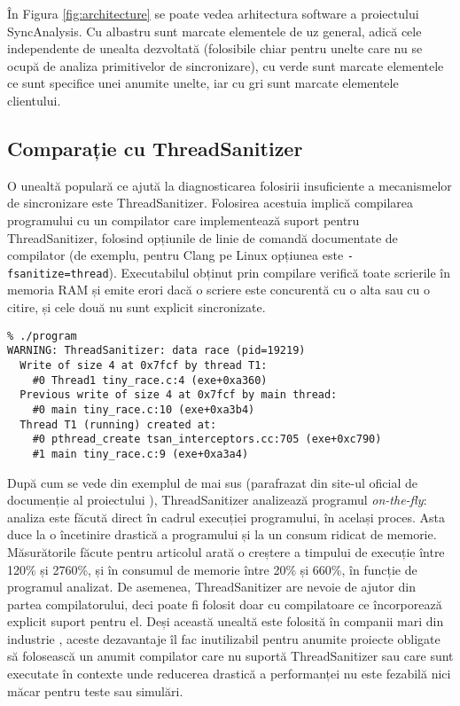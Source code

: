 În Figura \ref{fig:architecture} se poate vedea arhitectura software a
proiectului SyncAnalysis. Cu albastru sunt marcate elementele de uz
general, adică cele independente de unealta dezvoltată (folosibile chiar
pentru unelte care nu se ocupă de analiza primitivelor de sincronizare),
cu verde sunt marcate elementele ce sunt specifice unei anumite unelte,
iar cu gri sunt marcate elementele clientului.

\subsection{Comparație cu ThreadSanitizer}
O unealtă populară ce ajută la diagnosticarea folosirii insuficiente a
mecanismelor de sincronizare este ThreadSanitizer\cite{ThreadSanitizer}.
Folosirea acestuia implică compilarea programului cu un compilator care
implementează suport pentru ThreadSanitizer, folosind opțiunile de linie
de comandă documentate de compilator (de exemplu, pentru Clang pe Linux
opțiunea este \lstinline{-fsanitize=thread}). Executabilul obținut prin
compilare verifică toate scrierile în memoria RAM și emite erori dacă
o scriere este concurentă cu o alta sau cu o citire, și cele două nu
sunt explicit sincronizate.

\begin{lstlisting}[caption=Exemplu de folosire ThreadSanitizer]
% clang -fsanitize=thread -g -O1 -o program tiny_race.c
% ./program
WARNING: ThreadSanitizer: data race (pid=19219)
  Write of size 4 at 0x7fcf by thread T1:
    #0 Thread1 tiny_race.c:4 (exe+0xa360)
  Previous write of size 4 at 0x7fcf by main thread:
    #0 main tiny_race.c:10 (exe+0xa3b4)
  Thread T1 (running) created at:
    #0 pthread_create tsan_interceptors.cc:705 (exe+0xc790)
    #1 main tiny_race.c:9 (exe+0xa3a4)
\end{lstlisting}

După cum se vede din exemplul de mai sus (parafrazat din site-ul oficial
de documenție al proiectului \cite{ThreadSanitizerDoc}), ThreadSanitizer
analizează programul \textit{on-the-fly}: analiza este făcută direct în
cadrul execuției programului, în același proces. Asta duce la o
încetinire drastică a programului și la un consum ridicat de memorie.
Măsurătorile făcute pentru articolul \cite{ThreadSanitizer} arată o
creștere a timpului de execuție între 120\% și 2760\%, și în consumul de
memorie între 20\% și 660\%, în funcție de programul analizat. De
asemenea, ThreadSanitizer are nevoie de ajutor din partea
compilatorului, deci poate fi folosit doar cu compilatoare ce
încorporează explicit suport pentru el. Deși această unealtă este
folosită în companii mari din industrie \cite{ThreadSanitizer}, aceste
dezavantaje îl fac inutilizabil pentru anumite proiecte obligate să
folosească un anumit compilator care nu suportă ThreadSanitizer sau
care sunt executate în contexte unde reducerea drastică a performanței
nu este fezabilă nici măcar pentru teste sau simulări.

